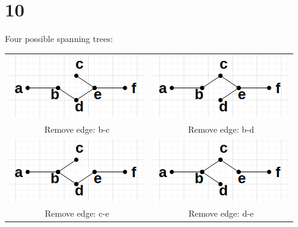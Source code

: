 \documentclass[12pt]{article}
\begin{document}
    \section*{10}
      \centering
        Four possible spanning trees:\\
      \begin{tabular}{cc}
        \includegraphics{10-1.png} &
        \includegraphics{10-2.png}
        \\
        Remove edge: b-c &
        Remove edge: b-d
        \\
        \includegraphics{10-3.png} &
        \includegraphics{10-4.png}
        \\
        Remove edge: c-e &
        Remove edge: d-e
      \end{tabular}
\end{document}
